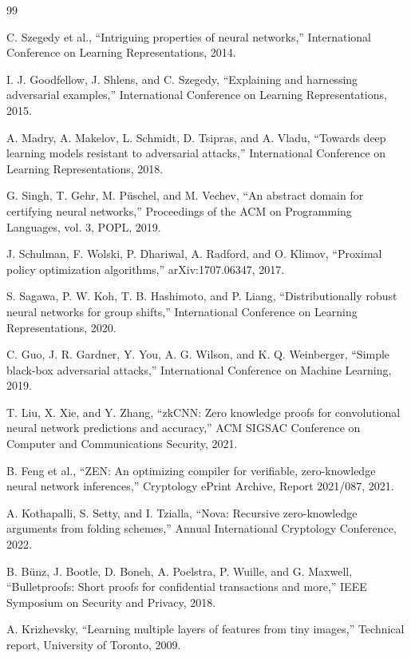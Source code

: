 \documentclass[11pt,a4paper]{article}
\begin{document}
\begin{thebibliography}{99}

C. Szegedy et al.,
``Intriguing properties of neural networks,''
International Conference on Learning Representations, 2014.

I. J. Goodfellow, J. Shlens, and C. Szegedy,
``Explaining and harnessing adversarial examples,''
International Conference on Learning Representations, 2015.

A. Madry, A. Makelov, L. Schmidt, D. Tsipras, and A. Vladu,
``Towards deep learning models resistant to adversarial attacks,''
International Conference on Learning Representations, 2018.

G. Singh, T. Gehr, M. P{\"u}schel, and M. Vechev,
``An abstract domain for certifying neural networks,''
Proceedings of the ACM on Programming Languages, vol. 3, POPL, 2019.

J. Schulman, F. Wolski, P. Dhariwal, A. Radford, and O. Klimov,
``Proximal policy optimization algorithms,''
arXiv:1707.06347, 2017.

S. Sagawa, P. W. Koh, T. B. Hashimoto, and P. Liang,
``Distributionally robust neural networks for group shifts,''
International Conference on Learning Representations, 2020.

C. Guo, J. R. Gardner, Y. You, A. G. Wilson, and K. Q. Weinberger,
``Simple black-box adversarial attacks,''
International Conference on Machine Learning, 2019.

T. Liu, X. Xie, and Y. Zhang,
``zkCNN: Zero knowledge proofs for convolutional neural network predictions and accuracy,''
ACM SIGSAC Conference on Computer and Communications Security, 2021.

B. Feng et al.,
``ZEN: An optimizing compiler for verifiable, zero-knowledge neural network inferences,''
Cryptology ePrint Archive, Report 2021/087, 2021.

A. Kothapalli, S. Setty, and I. Tzialla,
``Nova: Recursive zero-knowledge arguments from folding schemes,''
Annual International Cryptology Conference, 2022.

B. B{\"u}nz, J. Bootle, D. Boneh, A. Poelstra, P. Wuille, and G. Maxwell,
``Bulletproofs: Short proofs for confidential transactions and more,''
IEEE Symposium on Security and Privacy, 2018.

A. Krizhevsky,
``Learning multiple layers of features from tiny images,''
Technical report, University of Toronto, 2009.

\end{thebibliography}
\end{document}
